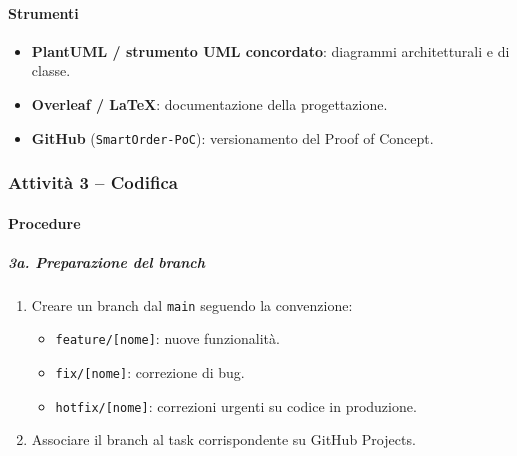 \documentclass[a4paper, 11pt, oneside]{scrartcl}
\begin{document}
\paragraph{Strumenti}
\begin{itemize}
    \item \textbf{PlantUML / strumento UML concordato}: diagrammi architetturali e di classe.
    \item \textbf{Overleaf / \LaTeX{}}: documentazione della progettazione.
    \item \textbf{GitHub} (\texttt{SmartOrder-PoC}): versionamento del Proof of Concept.
\end{itemize}

\subsubsection{Attività 3 – Codifica}

\paragraph{Procedure}

\subparagraph{3a. Preparazione del branch}
\begin{enumerate}
    \item Creare un branch dal \texttt{main} seguendo la convenzione:
          \begin{itemize}
              \item \texttt{feature/[nome]}: nuove funzionalità.
              \item \texttt{fix/[nome]}: correzione di bug.
              \item \texttt{hotfix/[nome]}: correzioni urgenti su codice in produzione.
          \end{itemize}
    \item Associare il branch al task corrispondente su GitHub Projects.
\end{enumerate}
\end{document}
